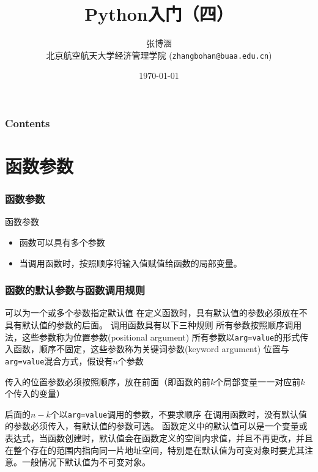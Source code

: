\documentclass[10pt]{beamer}
\title{Python入门（四）}
\author{张博涵\\
北京航空航天大学经济管理学院 (\texttt{zhangbohan@buaa.edu.cn})}
\date{\today}
\begin{document}
\begin{frame}
    \maketitle
\end{frame}


\begin{frame}
    \frametitle{Contents}

    \tableofcontents

\end{frame}


\section{函数参数}

\begin{frame}
    \frametitle{函数参数}

    \begin{block}{函数参数}
        \begin{itemize}
            \item 函数可以具有多个参数
            \item 当调用函数时，按照顺序将输入值赋值给函数的局部变量。
        \end{itemize}
    \end{block}

\end{frame}

\begin{frame}
    \frametitle{函数的默认参数与函数调用规则}

    \begin{outline}
        \1 可以为一个或多个参数指定默认值
        \1 在定义函数时，具有默认值的参数必须放在不具有默认值的参数的后面。
        \1 调用函数具有以下三种规则
            \2 所有参数按照顺序调用法，这些参数称为位置参数(positional argument)
            \2 所有参数以\texttt{arg=value}的形式传入函数，顺序不固定，这些参数称为关键词参数(keyword argument)
            \2 位置与\texttt{arg=value}混合方式，假设有$n$个参数

            传入的位置参数必须按照顺序，放在前面（即函数的前$k$个局部变量一一对应前$k$个传入的变量）

            后面的$n-k$个以\texttt{arg=value}调用的参数，不要求顺序
        \1 在调用函数时，没有默认值的参数必须传入，有默认值的参数可选。
        \1 函数定义中的默认值可以是一个变量或表达式，当函数创建时，默认值会在函数定义的空间内求值，并且不再更改，并且在整个存在的范围内指向同一片地址空间，特别是在默认值为可变对象时要尤其注意。一般情况下默认值为不可变对象。
    \end{outline}

\end{frame}
\end{document}

